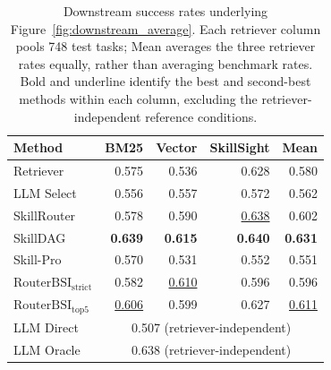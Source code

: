 \begin{table}[t]
\centering
\small
\setlength{\tabcolsep}{3pt}
\begin{tabular}{lrrrr}
\toprule
Method & BM25 & Vector & SkillSight & Mean \\
\midrule
Retriever & 0.575 & 0.536 & 0.628 & 0.580 \\
LLM Select & 0.556 & 0.557 & 0.572 & 0.562 \\
SkillRouter & 0.578 & 0.590 & \underline{0.638} & 0.602 \\
SkillDAG & \textbf{0.639} & \textbf{0.615} & \textbf{0.640} & \textbf{0.631} \\
Skill-Pro & 0.570 & 0.531 & 0.552 & 0.551 \\
$\mathrm{RouterBSI}_{\mathrm{strict}}$ & 0.582 & \underline{0.610} & 0.596 & 0.596 \\
$\mathrm{RouterBSI}_{\mathrm{top}5}$ & \underline{0.606} & 0.599 & 0.627 & \underline{0.611} \\
\midrule
LLM Direct & \multicolumn{4}{c}{0.507 (retriever-independent)} \\
LLM Oracle & \multicolumn{4}{c}{0.638 (retriever-independent)} \\
\bottomrule
\end{tabular}
\caption{Downstream success rates underlying Figure~\ref{fig:downstream_average}. Each retriever column pools 748 test tasks; Mean averages the three retriever rates equally, rather than averaging benchmark rates. Bold and underline identify the best and second-best methods within each column, excluding the retriever-independent reference conditions.}
\label{tab:app-downstream-mean}
\end{table}

